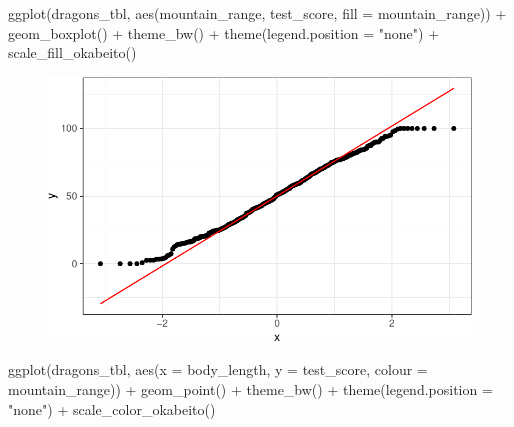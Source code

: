 \documentclass[
  letterpaper,
  DIV=11,
  oneside]{scrreport}
\newenvironment{Shaded}{\begin{snugshade}}{\end{snugshade}}
\newcommand{\AttributeTok}[1]{\textcolor[rgb]{0.40,0.45,0.13}{#1}}
\newcommand{\FunctionTok}[1]{\textcolor[rgb]{0.28,0.35,0.67}{#1}}
\newcommand{\NormalTok}[1]{\textcolor[rgb]{0.00,0.23,0.31}{#1}}
\newcommand{\SpecialCharTok}[1]{\textcolor[rgb]{0.37,0.37,0.37}{#1}}
\newcommand{\StringTok}[1]{\textcolor[rgb]{0.13,0.47,0.30}{#1}}
\begin{document}
\begin{Shaded}
\begin{Highlighting}[]
\FunctionTok{ggplot}\NormalTok{(dragons\_tbl, }\FunctionTok{aes}\NormalTok{(mountain\_range, test\_score, }\AttributeTok{fill =}\NormalTok{ mountain\_range)) }\SpecialCharTok{+}
  \FunctionTok{geom\_boxplot}\NormalTok{() }\SpecialCharTok{+}
  \FunctionTok{theme\_bw}\NormalTok{() }\SpecialCharTok{+}
  \FunctionTok{theme}\NormalTok{(}\AttributeTok{legend.position =} \StringTok{"none"}\NormalTok{) }\SpecialCharTok{+}
  \FunctionTok{scale\_fill\_okabeito}\NormalTok{()}
\end{Highlighting}
\end{Shaded}

\begin{figure}[H]

{\centering \includegraphics{./stat-modeling-mixed_files/figure-pdf/unnamed-chunk-9-1.pdf}

}

\end{figure}

\begin{Shaded}
\begin{Highlighting}[]
\FunctionTok{ggplot}\NormalTok{(dragons\_tbl, }\FunctionTok{aes}\NormalTok{(}\AttributeTok{x =}\NormalTok{ body\_length, }\AttributeTok{y =}\NormalTok{ test\_score, }\AttributeTok{colour =}\NormalTok{ mountain\_range)) }\SpecialCharTok{+}
  \FunctionTok{geom\_point}\NormalTok{() }\SpecialCharTok{+}
  \FunctionTok{theme\_bw}\NormalTok{() }\SpecialCharTok{+}
  \FunctionTok{theme}\NormalTok{(}\AttributeTok{legend.position =} \StringTok{"none"}\NormalTok{) }\SpecialCharTok{+}
  \FunctionTok{scale\_color\_okabeito}\NormalTok{()}
\end{Highlighting}
\end{Shaded}
\end{document}
